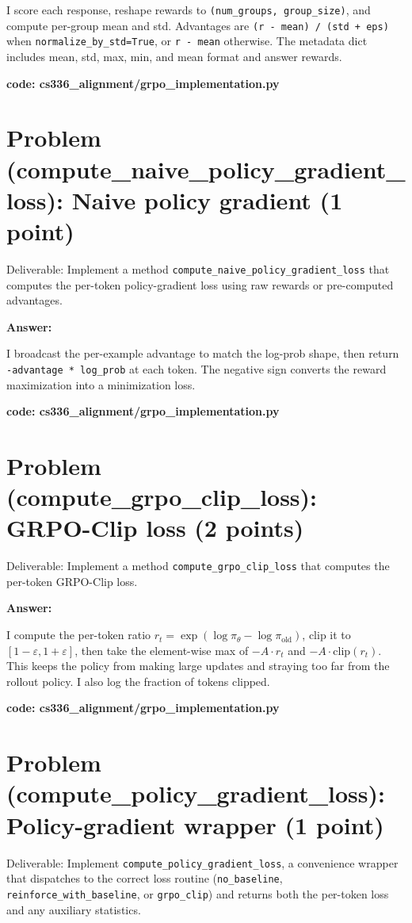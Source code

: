 \documentclass{article}
\begin{document}
I score each response, reshape rewards to \texttt{(num\_groups, group\_size)}, and compute per-group mean and std. Advantages are \texttt{(r - mean) / (std + eps)} when \texttt{normalize\_by\_std=True}, or \texttt{r - mean} otherwise. The metadata dict includes mean, std, max, min, and mean format and answer rewards.

\textbf{code: cs336\_alignment/grpo\_implementation.py}


\section*{Problem (compute\_naive\_policy\_gradient\_loss): Naive policy gradient (1 point)} %
Deliverable: Implement a method \texttt{compute\_naive\_policy\_gradient\_loss} that computes the per-token policy-gradient loss using raw rewards or pre-computed advantages. %

\textbf{Answer:}

I broadcast the per-example advantage to match the log-prob shape, then return \texttt{-advantage * log\_prob} at each token. The negative sign converts the reward maximization into a minimization loss.

\textbf{code: cs336\_alignment/grpo\_implementation.py}


\section*{Problem (compute\_grpo\_clip\_loss): GRPO-Clip loss (2 points)} %
Deliverable: Implement a method \texttt{compute\_grpo\_clip\_loss} that computes the per-token GRPO-Clip loss. %

\textbf{Answer:}

I compute the per-token ratio $r_t = \exp(\log\pi_\theta - \log\pi_\text{old})$, clip it to $[1-\varepsilon, 1+\varepsilon]$, then take the element-wise max of $-A \cdot r_t$ and $-A \cdot \text{clip}(r_t)$. This keeps the policy from making large updates and straying too far from the rollout policy. I also log the fraction of tokens clipped.

\textbf{code: cs336\_alignment/grpo\_implementation.py}


\section*{Problem (compute\_policy\_gradient\_loss): Policy-gradient wrapper (1 point)} %
Deliverable: Implement \texttt{compute\_policy\_gradient\_loss}, a convenience wrapper that dispatches to the correct loss routine (\texttt{no\_baseline}, \texttt{reinforce\_with\_baseline}, or \texttt{grpo\_clip}) and returns both the per-token loss and any auxiliary statistics. %
\end{document}
